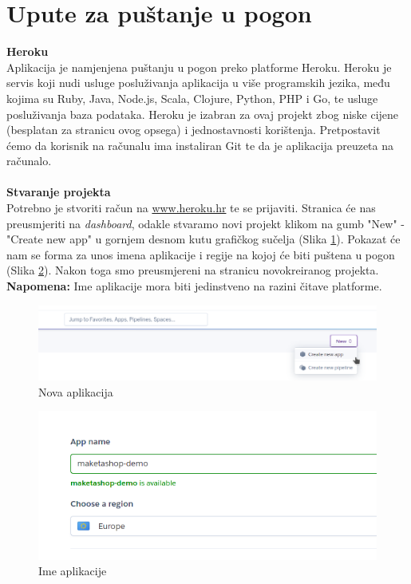 			\eject 
		
		\section{Upute za puštanje u pogon}
			\noindent\textbf{Heroku}\\
			Aplikacija je namjenjena puštanju u pogon preko platforme Heroku. Heroku je servis koji nudi usluge posluživanja aplikacija u više programskih jezika, među kojima su Ruby, Java, Node.js, Scala, Clojure, Python, PHP i Go, te usluge posluživanja baza podataka. Heroku je izabran za ovaj projekt zbog niske cijene (besplatan za stranicu ovog opsega) i jednostavnosti korištenja. Pretpostavit ćemo da korisnik na računalu ima instaliran Git te da je aplikacija preuzeta na računalo.
			\\\\
			\noindent\textbf{Stvaranje projekta}\\
			Potrebno je stvoriti račun na  \href{www.heroku.hr}{www.heroku.hr} te se prijaviti. Stranica će nas preusmjeriti na \textit{dashboard}, odakle stvaramo novi projekt klikom na gumb "New" - "Create new app" u gornjem desnom kutu grafičkog sučelja (Slika \ref{fig:newapp}). Pokazat će nam se forma za unos imena aplikacije i regije na kojoj će biti puštena u pogon (Slika \ref{fig:nameapp}). Nakon toga smo preusmjereni na stranicu novokreiranog projekta.
			\textbf{Napomena:} Ime aplikacije mora biti jedinstveno na razini čitave platforme. 
			\begin{figure}[H]
				\includegraphics[width=.9\linewidth]{slike/20210114_203519.png}
				\centering
				\caption{Nova aplikacija}
				\label{fig:newapp}
			\end{figure}
			\begin{figure}[H]
				\includegraphics[width=.9\linewidth]{slike/20210114_203555.png}
				\centering
				\caption{Ime aplikacije}
				\label{fig:nameapp}
			\end{figure}
